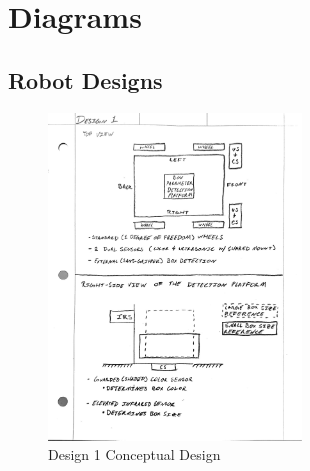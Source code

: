 \documentclass[12pt]{report}
\begin{document}
\chapter{Diagrams}

\section{Robot Designs}
\label{sc:designs}

\begin{figure}[H]
    \centering
    \includegraphics[width=0.6\textwidth]{Images/Designs/Design1.pdf}
    \caption{Design 1 Conceptual Design}
    \label{fig:design1}
\end{figure}
\end{document}
